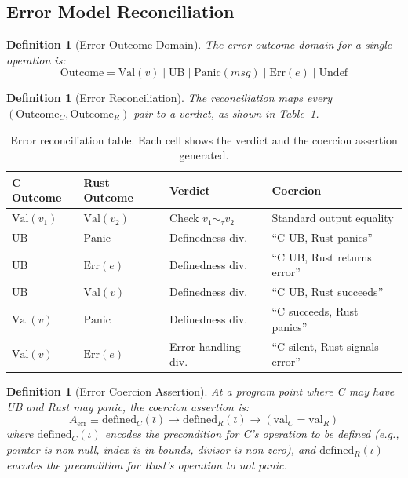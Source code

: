 \documentclass[11pt]{article}
\newtheorem{definition}[theorem]{Definition}
\begin{document}
\subsection{Error Model Reconciliation}
\label{sec:error-reconciliation}

\begin{definition}[Error Outcome Domain]
\label{def:error-outcome}
The error outcome domain for a single operation is:
\[
\mathrm{Outcome} = \mathrm{Val}(v) \mid \mathrm{UB} \mid \mathrm{Panic}(\mathit{msg}) \mid \mathrm{Err}(e) \mid \mathrm{Undef}
\]
\end{definition}

\begin{definition}[Error Reconciliation]
\label{def:error-recon}
The reconciliation maps every $(\mathrm{Outcome}_C, \mathrm{Outcome}_R)$ pair to a verdict, as shown in Table~\ref{tab:error-recon}.
\end{definition}

\begin{table}[t]
\centering
\caption{Error reconciliation table. Each cell shows the verdict and the coercion assertion generated.}
\label{tab:error-recon}
\begin{tabular}{@{}lllp{5cm}@{}}
\toprule
C Outcome & Rust Outcome & Verdict & Coercion \\
\midrule
$\mathrm{Val}(v_1)$ & $\mathrm{Val}(v_2)$ & Check $v_1 \sim_\tau v_2$ & Standard output equality \\
$\mathrm{UB}$ & $\mathrm{Panic}$ & Definedness div.\ & ``C UB, Rust panics'' \\
$\mathrm{UB}$ & $\mathrm{Err}(e)$ & Definedness div.\ & ``C UB, Rust returns error'' \\
$\mathrm{UB}$ & $\mathrm{Val}(v)$ & Definedness div.\ & ``C UB, Rust succeeds'' \\
$\mathrm{Val}(v)$ & $\mathrm{Panic}$ & Definedness div.\ & ``C succeeds, Rust panics'' \\
$\mathrm{Val}(v)$ & $\mathrm{Err}(e)$ & Error handling div.\ & ``C silent, Rust signals error'' \\
\bottomrule
\end{tabular}
\end{table}

\begin{definition}[Error Coercion Assertion]
\label{def:error-coercion}
At a program point where C may have UB and Rust may panic, the coercion assertion is:
\[
A_{\mathrm{err}} \equiv \mathrm{defined}_C(\bar{\iota}) \to \mathrm{defined}_R(\bar{\iota}) \to (\mathrm{val}_C = \mathrm{val}_R)
\]
where $\mathrm{defined}_C(\bar{\iota})$ encodes the precondition for C's operation to be defined (e.g., pointer is non-null, index is in bounds, divisor is non-zero), and $\mathrm{defined}_R(\bar{\iota})$ encodes the precondition for Rust's operation to not panic.
\end{definition}
\end{document}
